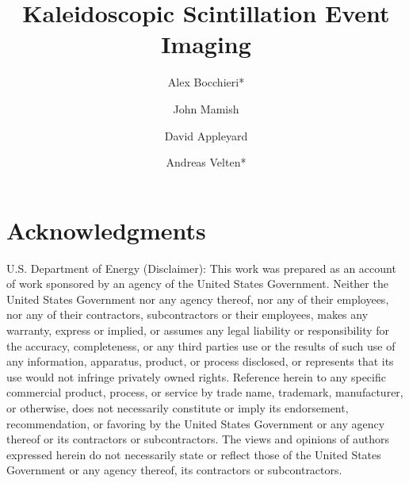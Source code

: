 \documentclass{article}
\begin{document}
\title{Kaleidoscopic Scintillation Event Imaging}

\author[1]{Alex Bocchieri*} %
\author[2,3]{John Mamish}
\author[2]{David Appleyard}
\author[4,5]{Andreas Velten*}%



\date{}

\maketitle



%
%
%
%
%









\section{Acknowledgments}
\noindent
U.S. Department of Energy (Disclaimer): 
This work was prepared as an account of work sponsored by an agency of the United 
States Government. 
Neither the United States Government nor any agency thereof, nor any of their 
employees, nor any of their contractors, subcontractors or their employees, makes 
any warranty, express or implied, or assumes any legal liability or 
responsibility for the accuracy, completeness, or any third parties use or the 
results of such use of any information, apparatus, product, or process disclosed, 
or represents that its use would not infringe privately owned rights. 
Reference herein to any specific commercial product, process, or service by trade 
name, trademark, manufacturer, or otherwise, does not necessarily constitute or 
imply its endorsement, recommendation, or favoring by the United States 
Government or any agency thereof or its contractors or subcontractors. 
The views and opinions of authors expressed herein do not necessarily state or 
reflect those of the United States Government or any agency thereof, its 
contractors or subcontractors.
\end{document}
